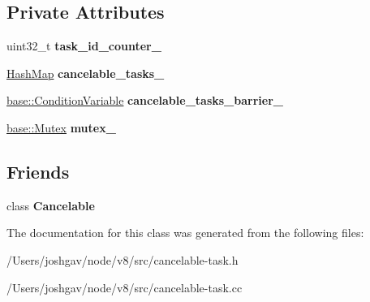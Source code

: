\subsection*{Private Attributes}
\begin{DoxyCompactItemize}
\item 
uint32\+\_\+t {\bfseries task\+\_\+id\+\_\+counter\+\_\+}\hypertarget{classv8_1_1internal_1_1_cancelable_task_manager_a9a5985e3417b91a863d939f0acfc689f}{}\label{classv8_1_1internal_1_1_cancelable_task_manager_a9a5985e3417b91a863d939f0acfc689f}

\item 
\hyperlink{classv8_1_1internal_1_1_template_hash_map_impl}{Hash\+Map} {\bfseries cancelable\+\_\+tasks\+\_\+}\hypertarget{classv8_1_1internal_1_1_cancelable_task_manager_af7ee7872d21bc7941d5693156a3781a4}{}\label{classv8_1_1internal_1_1_cancelable_task_manager_af7ee7872d21bc7941d5693156a3781a4}

\item 
\hyperlink{classv8_1_1base_1_1_condition_variable}{base\+::\+Condition\+Variable} {\bfseries cancelable\+\_\+tasks\+\_\+barrier\+\_\+}\hypertarget{classv8_1_1internal_1_1_cancelable_task_manager_af9865df2b36897c7a59bbbbd06fd5760}{}\label{classv8_1_1internal_1_1_cancelable_task_manager_af9865df2b36897c7a59bbbbd06fd5760}

\item 
\hyperlink{classv8_1_1base_1_1_mutex}{base\+::\+Mutex} {\bfseries mutex\+\_\+}\hypertarget{classv8_1_1internal_1_1_cancelable_task_manager_a16488ae48a2809c43a6fef6d051d9bfc}{}\label{classv8_1_1internal_1_1_cancelable_task_manager_a16488ae48a2809c43a6fef6d051d9bfc}

\end{DoxyCompactItemize}
\subsection*{Friends}
\begin{DoxyCompactItemize}
\item 
class {\bfseries Cancelable}\hypertarget{classv8_1_1internal_1_1_cancelable_task_manager_a9c1763d9d6c045212734b3087ea842ad}{}\label{classv8_1_1internal_1_1_cancelable_task_manager_a9c1763d9d6c045212734b3087ea842ad}

\end{DoxyCompactItemize}


The documentation for this class was generated from the following files\+:\begin{DoxyCompactItemize}
\item 
/\+Users/joshgav/node/v8/src/cancelable-\/task.\+h\item 
/\+Users/joshgav/node/v8/src/cancelable-\/task.\+cc\end{DoxyCompactItemize}
